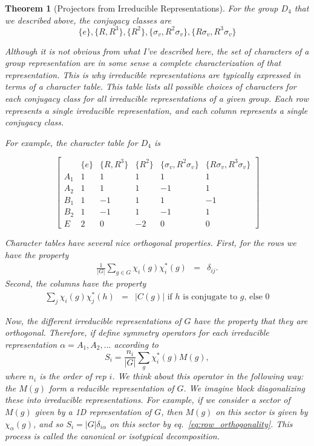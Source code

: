 \documentclass{article}
\newtheorem{theorem}{Theorem}[section]
\theoremstyle{definition}
\begin{document}
\begin{theorem}[Projectors from Irreducible Representations]
For the group $D_4$ that we described above, the conjugacy classes are 
\begin{equation}
\{e\}, \{R, R^3\},\{R^2\}, \{\sigma_v, R^2 \sigma_v\}, \{R \sigma_v, R^3 \sigma_v\}
\end{equation}

Although it is not obvious from what I've described here, the set of characters of a group representation are in some sense a complete characterization of that representation. This is why irreducible representations are typically expressed in terms of a \emph{character table}. This table lists all possible choices of characters for each conjugacy class for all irreducible representations of a given group. Each row represents a single irreducible representation, and each column represents a single conjugacy class. 

For example, the character table for $D_4$ is 

\begin{equation}
\begin{bmatrix}
& \{e\} & \{R, R^3\} & \{R^2\} & \{\sigma_v, R^2 \sigma_v\} & \{R \sigma_v, R^3 \sigma_v\}\\
A_1 & 1 & 1 & 1 & 1 & 1\\
A_2 & 1 & 1 &1 & -1 & 1\\
B_1 & 1 & -1 & 1 & 1 & -1\\
B_2 & 1 & -1 & 1 & -1 & 1\\
E & 2 & 0 & - 2 & 0 & 0
\end{bmatrix}
\end{equation}

Character tables have several nice orthogonal properties. First, for the rows we have the property
\begin{eqnarray}
\frac{1}{|G|} \sum_{g \in G} \chi_i(g) \chi_i^*(g) &=& \delta_{ij}. \label{eq:row_orthogonality}
\end{eqnarray}
Second, the columns have the property
\begin{eqnarray}
\sum_j \chi_i(g) \chi_j^*(h) &=& |C(g)| \text{ if $h$ is conjugate to $g$, else $0$} \label{eq:column_orthogonality}
\end{eqnarray}

Now, the different irreducible representations of $G$ have the property that they are orthogonal. Therefore, if define symmetry operators for each irreducible representation $\alpha = A_1, A_2, ...$ according to
\begin{equation}
S_i =\frac{n_i}{|G|} \sum_g \chi^*_i(g) M(g),
\end{equation}
where $n_i$ is the order of rep $i$. We think about this operator in the following way: the $M(g)$ form a reducible representation of $G$. We imagine block diagonalizing these into irreducible representations. For example, if we consider a sector of $M(g)$ given by a 1D representation of $G$, then $M(g)$ on this sector is given by $\chi_\alpha(g)$, and so $S_i = |G| \delta_{i\alpha}$ on this sector by eq.~\ref{eq:row_orthogonality}. This process is called the \emph{canonical} or \emph{isotypical} decomposition.


\end{theorem}
\end{document}

